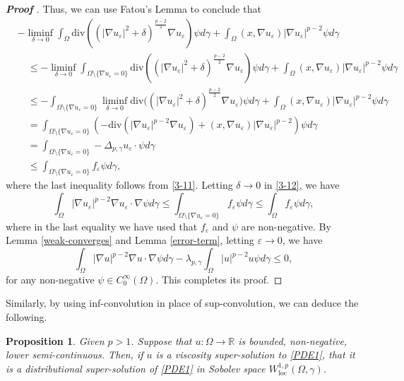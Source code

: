 \documentclass[12pt]{amsart}
\newtheorem{proposition}[theorem]{Proposition}
\newcommand{\R}{\mathbb R}
\newcommand{\1}{\mathbf 1}
\begin{document}
\begin{proof}[\bf Proof ]
Thus, we can use Fatou's Lemma to conclude that
\begin{align*}
&-\mathop {\lim \inf}_{\delta\rightarrow 0}\int_{\Omega}\mathrm{div} \left((|\nabla u_\varepsilon|^2+\delta)^{\frac{p-2}{2}} \nabla u_\varepsilon\right)  \psi d\gamma+\int_\Omega (x,\nabla u_\varepsilon)|\nabla u_\varepsilon|^{p-2}\psi d\gamma\\
&\quad \leq -\mathop {\lim \inf}_{\delta\rightarrow 0}\int_{\Omega \setminus \{ \nabla u_\varepsilon= 0\}}\mathrm{div} \left((|\nabla u_\varepsilon|^2+\delta)^{\frac{p-2}{2}} \nabla u_\varepsilon\right)  \psi d\gamma+\int_\Omega (x,\nabla u_\varepsilon)|\nabla u_\varepsilon|^{p-2}\psi d\gamma\\
&\quad \leq -\int_{\Omega \setminus \{\nabla u_\varepsilon=0 \}} \mathop {\lim \inf}_{\delta\rightarrow 0} \mathrm{div} \big((|\nabla u_\varepsilon|^2+\delta)^{\frac{p-2}{2}} \nabla u_\varepsilon\big)   \psi d\gamma+\int_\Omega (x,\nabla u_\varepsilon)|\nabla u_\varepsilon|^{p-2}\psi d\gamma\\
&\quad = \int_{\Omega \setminus \{\nabla u_\varepsilon=0 \}} (-\mathrm{div} \left(|\nabla u_\varepsilon|^{p-2} \nabla u_\varepsilon \right) +(x,\nabla u_\varepsilon)|\nabla u_\varepsilon|^{p-2} ) \psi d\gamma\\
&\quad =\int_{\Omega \setminus \{\nabla u_\varepsilon=0 \}} -\Delta_{p,\gamma}u_\varepsilon \cdot \psi d\gamma\\
&\quad \leq \int_{\Omega\setminus \{\nabla u_\varepsilon=0 \} }f_\varepsilon \psi d\gamma,
\end{align*}
where the last inequality follows from \eqref{3-11}. Letting $\delta\rightarrow 0$ in \eqref{3-12}, we have
\[
\int_\Omega |\nabla u_\varepsilon|^{p-2} \nabla u_\varepsilon \cdot \nabla \psi d\gamma \leq \int_{\Omega \setminus \{\nabla u_\varepsilon=0 \}} f_\varepsilon \psi d\gamma\leq \int_{\Omega} f_\varepsilon \psi d\gamma,
\]
where in the last equality we have used  that $f_\varepsilon$ and $\psi$ are non-negative. By Lemma \ref{weak-converges} and Lemma \ref{error-term}, letting $\varepsilon \rightarrow 0$, we have
\[
\int_\Omega |\nabla u|^{p-2} \nabla {u} \cdot \nabla \psi d\gamma - \lambda_{p,\gamma} \int_{\Omega} |u|^{p-2} u \psi d\gamma\leq 0,
\]
for any non-negative $\psi \in C^{\infty}_0(\Omega)$. This completes its proof.
\end{proof}




Similarly, by using inf-convolution in place of sup-convolution, we can deduce the following.
\begin{proposition}\label{remark1}
 Given $p>1$. Suppose that $u:\Omega \rightarrow \R$ is bounded, non-negative, lower semi-continuous. Then, if $u$ is a viscosity super-solution to \eqref{PDE1}, that it is a distributional super-solution of \eqref{PDE1} in Sobolev space $W_{\mathrm{loc}}^{1,p}(\Omega,\gamma)$.
\end{proposition}
\end{document}
